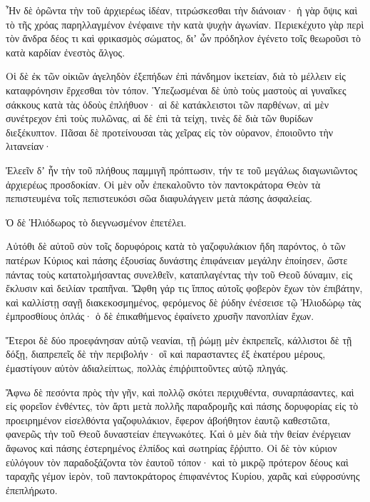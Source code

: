 {\par }{\PP {}Ἦν δὲ ὁρῶντα τὴν τοῦ ἀρχιερέως ἰδέαν, τιτρώσκεσθαι τὴν διάνοιαν· ἡ γὰρ ὄψις καὶ τὸ τῆς χρόας παρηλλαγμένον ἐνέφαινε τὴν κατὰ ψυχὴν ἀγωνίαν.
Περιεκέχυτο γὰρ περὶ τὸν ἄνδρα δέος τι καὶ φρικασμὸς σώματος, διʼ ὧν πρόδηλον ἐγένετο τοῖς θεωροῦσι τὸ κατὰ καρδίαν ἐνεστὸς ἄλγος.
\par }{\PP {}Οἱ δὲ ἐκ τῶν οἰκιῶν ἀγεληδὸν ἐξεπήδων ἐπὶ πάνδημον ἱκετείαν, διὰ τὸ μέλλειν εἰς καταφρόνησιν ἔρχεσθαι τὸν τόπον.
Ὑπεζωσμέναι δὲ ὑπὸ τοὺς μαστοὺς αἱ γυναῖκες σάκκους κατὰ τὰς ὁδοὺς ἐπλήθυον· αἱ δὲ κατάκλειστοι τῶν παρθένων, αἱ μὲν συνέτρεχον ἐπὶ τοὺς πυλῶνας, αἱ δὲ ἐπὶ τὰ τείχη, τινὲς δὲ διὰ τῶν θυρίδων διεξέκυπτον.
Πᾶσαι δὲ προτείνουσαι τὰς χεῖρας εἰς τὸν οὐρανον, ἐποιοῦντο τὴν λιτανείαν·
\par }{\PP {}Ἐλεεῖν δʼ ἦν τὴν τοῦ πλήθους παμμιγῆ πρόπτωσιν, τήν τε τοῦ μεγάλως διαγωνιῶντος ἀρχιερέως προσδοκίαν.
Οἱ μὲν οὖν ἐπεκαλοῦντο τὸν παντοκράτορα Θεὸν τὰ πεπιστευμένα τοῖς πεπιστευκόσι σῶα διαφυλάγγειν μετὰ πάσης ἀσφαλείας.
\par }{\PP {}Ὁ δὲ Ἡλιόδωρος τὸ διεγνωσμένον ἐπετέλει.
\par }{\PP {}Αὐτόθι δὲ αὐτοῦ σὺν τοῖς δορυφόροις κατὰ τὸ γαζοφυλάκιον ἤδη παρόντος, ὁ τῶν πατέρων Κύριος καὶ πάσης ἐξουσίας δυνάστης ἐπιφάνειαν μεγάλην ἐποίησεν, ὥστε πάντας τοὺς κατατολμήσαντας συνελθεῖν, καταπλαγέντας τὴν τοῦ Θεοῦ δύναμιν, εἰς ἔκλυσιν καὶ δειλίαν τραπῆναι.
Ὤφθη γάρ τις ἵππος αὐτοῖς φοβερὸν ἔχων τὸν ἐπιβάτην, καὶ καλλίστῃ σαγῇ διακεκοσμημένος, φερόμενος δὲ ῥύδην ἐνέσεισε τῷ Ἡλιοδώρῳ τὰς ἐμπροσθίους ὁπλάς· ὁ δὲ ἐπικαθήμενος ἐφαίνετο χρυσῆν πανοπλίαν ἔχων.
\par }{\PP {}Ἕτεροι δὲ δύο προεφάνησαν αὐτῷ νεανίαι, τῇ ῥώμῃ μὲν ἐκπρεπεῖς, κάλλιστοι δὲ τῇ δόξῃ, διαπρεπεῖς δὲ τὴν περιβολήν· οἳ καὶ παρασταντες ἐξ ἑκατέρου μέρους, ἐμαστίγουν αὐτὸν ἀδιαλείπτως, πολλὰς ἐπιῤῥιπτοῦντες αὐτῷ πληγάς.
\par }{\PP {}Ἄφνω δὲ πεσόντα πρὸς τὴν γῆν, καὶ πολλῷ σκότει περιχυθέντα, συναρπάσαντες, καὶ εἰς φορεῖον ἐνθέντες,
τὸν ἄρτι μετὰ πολλῆς παραδρομῆς καὶ πάσης δορυφορίας εἰς τὸ προειρημένον εἰσελθόντα γαζοφυλάκιον, ἔφερον ἀβοήθητον ἑαυτῷ καθεστῶτα, φανερῶς τὴν τοῦ Θεοῦ δυναστείαν ἐπεγνωκότες.
Καὶ ὁ μὲν διὰ τὴν θείαν ἐνέργειαν ἄφωνος καὶ πάσης ἐστερημένος ἐλπίδος καὶ σωτηρίας ἔῤῥιπτο.
Οἱ δὲ τὸν κύριον εὐλόγουν τὸν παραδοξάζοντα τὸν ἑαυτοῦ τόπον· καὶ τὸ μικρῷ πρότερον δέους καὶ ταραχῆς γέμον ἱερὸν, τοῦ παντοκράτορος ἐπιφανέντος Κυρίου, χαρᾶς καὶ εὐφροσύνης ἐπεπλήρωτο.
}
